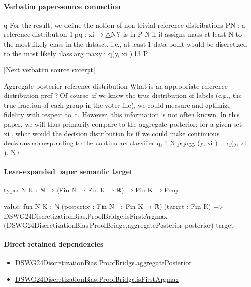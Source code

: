 \documentclass[10pt]{article}
\begin{document}
\paragraph{Verbatim paper-source connection}
\begin{ReviewVerbatim}
q
    For the result, we define the notion of non-trivial reference distributions PN     : a reference distribution
                                                       1
pq : {xi } → △NY is in P N if it assigns mass at least N to the most likely class in the  dataset, i.e., at least 1
data point would be discretized to the most likely class arg maxy i q(y, xi ).13
                                                                   P


[Next verbatim source excerpt]

Aggregate posterior reference distribution What is an appropriate reference distribution pref ? Of
course, if we knew the true distribution of labels (e.g., the true fraction of each group in the voter file), we
could measure and optimize fidelity with respect to it. However, this information is not often known. In this
paper, we will thus primarily compare to the aggregate posterior: for a given set {xi }, what would the
decision distribution be if we could make continuous decisions corresponding to the continuous classifier q,
                                                                  1 X
                                            pqagg (y, {xi }) =        q(y, xi ).
                                                                  N i
\end{ReviewVerbatim}



\paragraph{Lean-expanded paper semantic target}
\begin{ReviewVerbatim}
type:
{N K : ℕ} → (Fin N → Fin K → ℝ) → Fin K → Prop

value:
fun {N K : ℕ} (posterior : Fin N → Fin K → ℝ) (target : Fin K) =>
  DSWG24DiscretizationBias.ProofBridge.isFirstArgmax (DSWG24DiscretizationBias.ProofBridge.aggregatePosterior posterior)
    target
\end{ReviewVerbatim}

\paragraph{Direct retained dependencies}
\begin{itemize}\raggedright
\item \hyperlink{governing-declaration-71a4a73d8c8948eb}{DSWG24\allowbreak{}Discretization\allowbreak{}Bias.\allowbreak{}Proof\allowbreak{}Bridge.\allowbreak{}aggregate\allowbreak{}Posterior}
\item \hyperlink{governing-declaration-af44c4b45082ddcb}{DSWG24\allowbreak{}Discretization\allowbreak{}Bias.\allowbreak{}Proof\allowbreak{}Bridge.\allowbreak{}is\allowbreak{}First\allowbreak{}Argmax}
\end{itemize}
\end{document}
